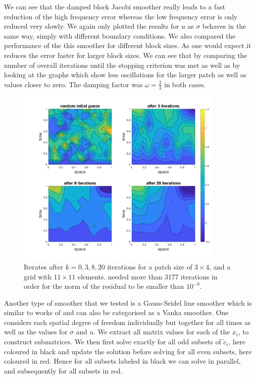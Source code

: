 \documentclass[../draft_1.tex]{subfiles}
\begin{document}
We can see that the damped block Jacobi smoother really leads to a fast reduction of the high frequency error whereas the low frequency error is only reduced very slowly. We again only plotted the results for $u$ as $\sigma$ behaves in the same way, simply with different boundary conditions. We also compared the performance of the this smoother for different block sizes. As one would expect it reduces the error faster for larger block sizes. We can see that by comparing the number of overall iterations until the stopping criterion was met as well as by looking at the graphs which show less oscillations for the larger patch as well as values closer to zero. The damping factor was $\omega = \frac{2}{3}$ in both cases.  
\smallskip
\\
\begin{figure}[ht!]
	\centering
	\includegraphics[width=0.9\textwidth]{images/implementation/contour_plot_1_blk_size3by4}
	\caption{Iterates after $k = 0,3,8, 20$ iterations for a patch size of $3 \times 4$, and a grid with $11 \times 11$ elements. needed more than 3177 iterations in order for the norm of the residual to be smaller than $ 10^{-9}$.}
	\label{fig:smoother_3by4}
\end{figure}

Another type of smoother that we tested is a Gauss-Seidel line smoother which is similar to works of \cite{adams2001distributed} and can also be categorised as a Vanka smoother. One considers each spatial degree of freedom individually but together for all times as well as the values for $\sigma$ and $u$. We extract all matrix values for each of the $x_i$, to construct submatrices. We then first solve exactly for all odd subsets of $\tilde{c}_i$, here coloured in black and update the solution before solving for all even subsets, here coloured in red. Hence for all subsets labeled in black we can solve in parallel, and subsequently for all subsets in red. 
\end{document}
